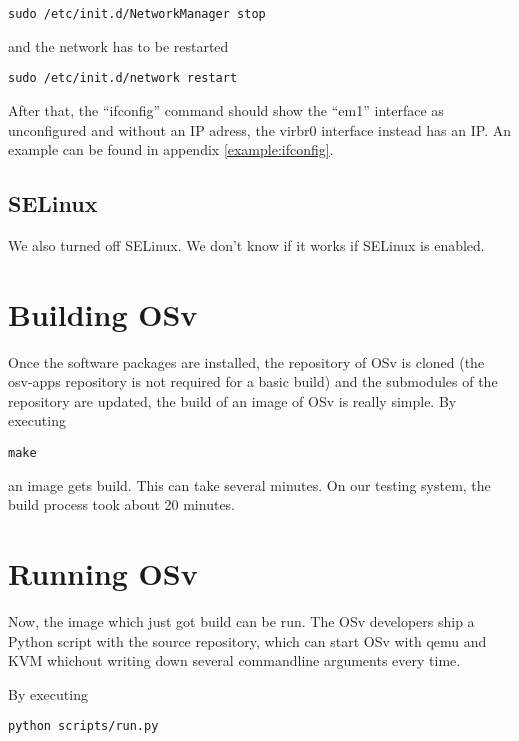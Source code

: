 \begin{lstlisting}
sudo /etc/init.d/NetworkManager stop
\end{lstlisting}

        and the network has to be restarted

\begin{lstlisting}
sudo /etc/init.d/network restart
\end{lstlisting}

        After that, the ``ifconfig'' command should show the ``em1'' interface
        as unconfigured and without an IP adress, the virbr0 interface instead
        has an IP. An example can be found in appendix \ref{example:ifconfig}.


    \section{SELinux}

        We also turned off SELinux. We don't know if it works if SELinux is
        enabled.

\chapter{Building OSv}

    Once the software packages are installed, the repository of OSv is
    cloned (the osv-apps repository is not required for a basic build) and
    the submodules of the repository are updated, the build of an image of
    OSv is really simple. By executing

\begin{lstlisting}
make
\end{lstlisting}

    an image gets build. This can take several minutes. On our testing
    system, the build process took about 20 minutes.

\chapter{Running OSv}

    Now, the image which just got build can be run. The OSv developers ship a
    Python script with the source repository, which can start OSv with qemu and
    KVM whichout writing down several commandline arguments every time.

    By executing

\begin{lstlisting}
python scripts/run.py
\end{lstlisting}

